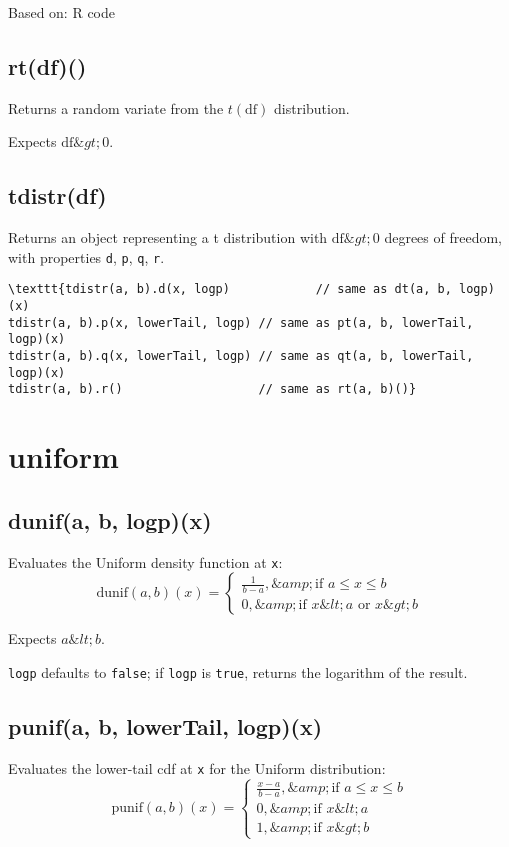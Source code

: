 \documentclass{article}
\begin{document}
Based on: R code


    \subsection*{rt(df)()}
    Returns a random variate from the $t(\textrm{df})$ distribution.


Expects $\textrm{df} \&gt; 0$.


    \subsection*{tdistr(df)}
    Returns an object representing a t distribution with $\textrm{df} \&gt; 0$
degrees of freedom, with properties \texttt{d}, \texttt{p}, \texttt{q}, \texttt{r}.


\begin{lstlisting}
\texttt{tdistr(a, b).d(x, logp)            // same as dt(a, b, logp)(x)
tdistr(a, b).p(x, lowerTail, logp) // same as pt(a, b, lowerTail, logp)(x)
tdistr(a, b).q(x, lowerTail, logp) // same as qt(a, b, lowerTail, logp)(x)
tdistr(a, b).r()                   // same as rt(a, b)()}\end{lstlisting}

  \section{uniform}
    \subsection*{dunif(a, b, logp)(x)}
    Evaluates the Uniform density function at \texttt{x}:
$$\textrm{dunif}(a, b)(x) = \begin{cases}
  \frac{1}{b-a},  \&amp; \text{if $a \leq x \leq b$} \\
  0, \&amp; \text{if $x \&lt; a$ or $x \&gt; b$} \end{cases} $$


Expects $a \&lt; b$.


\texttt{logp} defaults to \texttt{false}; if \texttt{logp} is \texttt{true}, returns the
logarithm of the result.


    \subsection*{punif(a, b, lowerTail, logp)(x)}
    Evaluates the lower-tail cdf at \texttt{x} for the Uniform distribution:
$$\textrm{punif}(a, b)(x) = \begin{cases}
  \frac{x-a}{b-a},  \&amp; \text{if $a \leq x \leq b$} \\
  0,                \&amp; \text{if $x \&lt; a$} \\
  1,                \&amp; \text{if $x \&gt; b$} \end{cases} $$
\end{document}
